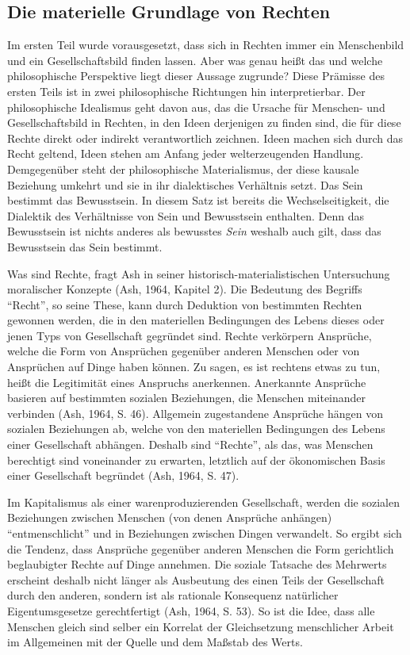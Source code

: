 \documentclass[ngerman,12pt, titlepage, smallheadings, nomath]{scrartcl}
\begin{document}
\subsection{Die materielle Grundlage von
Rechten}\label{die-materielle-grundlage-von-rechten}

Im ersten Teil wurde vorausgesetzt, dass sich in Rechten immer ein
Menschenbild und ein Gesellschaftsbild finden lassen. Aber was genau
heißt das und welche philosophische Perspektive liegt dieser Aussage
zugrunde? Diese Prämisse des ersten Teils ist in zwei philosophische
Richtungen hin interpretierbar. Der philosophische Idealismus geht davon
aus, das die Ursache für Menschen- und Gesellschaftsbild in Rechten, in
den Ideen derjenigen zu finden sind, die für diese Rechte direkt oder
indirekt verantwortlich zeichnen. Ideen machen sich durch das Recht
geltend, Ideen stehen am Anfang jeder welterzeugenden Handlung.
Demgegenüber steht der philosophische Materialismus, der diese kausale
Beziehung umkehrt und sie in ihr dialektisches Verhältnis setzt. Das
Sein bestimmt das Bewusstsein. In diesem Satz ist bereits die
Wechselseitigkeit, die Dialektik des Verhältnisse von Sein und
Bewusstsein enthalten. Denn das Bewusstsein ist nichts anderes als
bewusstes \emph{Sein} weshalb auch gilt, dass das Bewusstsein das Sein
bestimmt.

Was sind Rechte, fragt Ash in seiner historisch-materialistischen
Untersuchung moralischer Konzepte (Ash, 1964, Kapitel 2). Die Bedeutung
des Begriffs \enquote{Recht}, so seine These, kann durch Deduktion von
bestimmten Rechten gewonnen werden, die in den materiellen Bedingungen
des Lebens dieses oder jenen Typs von Gesellschaft gegründet sind.
Rechte verkörpern Ansprüche, welche die Form von Ansprüchen gegenüber
anderen Menschen oder von Ansprüchen auf Dinge haben können. Zu sagen,
es ist rechtens etwas zu tun, heißt die Legitimität eines Anspruchs
anerkennen. Anerkannte Ansprüche basieren auf bestimmten sozialen
Beziehungen, die Menschen miteinander verbinden (Ash, 1964, S. 46).
Allgemein zugestandene Ansprüche hängen von sozialen Beziehungen ab,
welche von den materiellen Bedingungen des Lebens einer Gesellschaft
abhängen. Deshalb sind \enquote{Rechte}, als das, was Menschen
berechtigt sind voneinander zu erwarten, letztlich auf der ökonomischen
Basis einer Gesellschaft begründet (Ash, 1964, S. 47).

Im Kapitalismus als einer warenproduzierenden Gesellschaft, werden die
sozialen Beziehungen zwischen Menschen (von denen Ansprüche anhängen)
\enquote{entmenschlicht} und in Beziehungen zwischen Dingen verwandelt.
So ergibt sich die Tendenz, dass Ansprüche gegenüber anderen Menschen
die Form gerichtlich beglaubigter Rechte auf Dinge annehmen. Die soziale
Tatsache des Mehrwerts erscheint deshalb nicht länger als Ausbeutung des
einen Teils der Gesellschaft durch den anderen, sondern ist als
rationale Konsequenz natürlicher Eigentumsgesetze gerechtfertigt (Ash,
1964, S. 53). So ist die Idee, dass alle Menschen gleich sind selber ein
Korrelat der Gleichsetzung menschlicher Arbeit im Allgemeinen mit der
Quelle und dem Maßstab des Werts.
\end{document}
